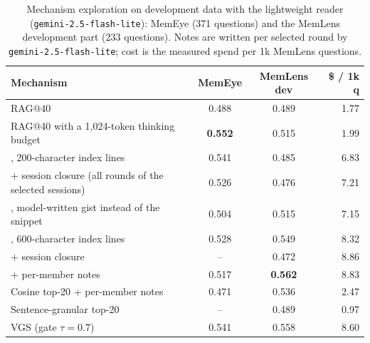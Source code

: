 \begin{table}[t]
\centering
\caption{Mechanism exploration on development data with the lightweight reader (\texttt{gemini-2.5-flash-lite}): MemEye (371 questions) and the MemLens development part (233 questions). Notes are written per selected round by \texttt{gemini-2.5-flash-lite}; cost is the measured spend per 1k MemLens questions.}
\label{tab:p5dev}
\small
\begin{tabular}{lccr}
\toprule
Mechanism & MemEye & MemLens dev & \$ / 1k q \\
\midrule
RAG@40 & 0.488 & 0.489 & 1.77 \\
RAG@40 with a 1,024-token thinking budget & \textbf{0.552} & 0.515 & 1.99 \\
\qss{}, 200-character index lines & 0.541 & 0.485 & 6.83 \\
\quad + session closure (all rounds of the selected sessions) & 0.526 & 0.476 & 7.21 \\
\qss{}, model-written gist instead of the snippet & 0.504 & 0.515 & 7.15 \\
\qss{}, 600-character index lines & 0.528 & 0.549 & 8.32 \\
\quad + session closure & -- & 0.472 & 8.86 \\
\quad + per-member notes & 0.517 & \textbf{0.562} & 8.83 \\
Cosine top-20 + per-member notes & 0.471 & 0.536 & 2.47 \\
Sentence-granular top-20 & -- & 0.489 & 0.97 \\
VGS (gate $\tau{=}0.7$) & 0.541 & 0.558 & 8.60 \\
\bottomrule
\end{tabular}
\end{table}

